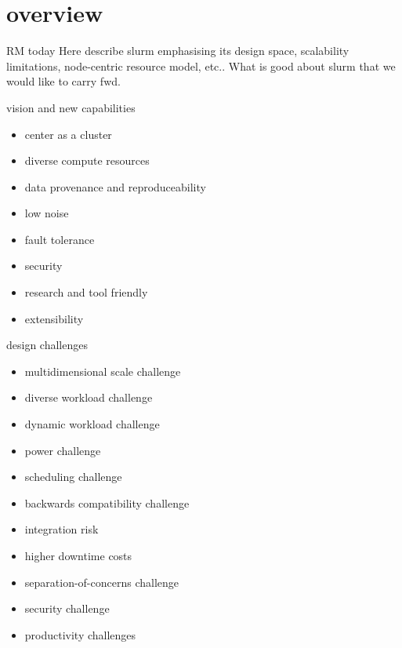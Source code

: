 \documentclass[default,pdf,colorBG,slideColor]{prosper}
\begin{document}
\part{overview}
\begin{slide}{RM today}{\small
Here describe slurm emphasising its design space, scalability
limitations, node-centric resource model, etc..  What is good about slurm
that we would like to carry fwd.
}\end{slide}
\begin{slide}{vision and new capabilities}{\small
\begin{itemize}
  \item{center as a cluster}
  \item{diverse compute resources}
  \item{data provenance and reproduceability}
  \item{low noise}
  \item{fault tolerance}
  \item{security}
  \item{research and tool friendly}
  \item{extensibility}
\end{itemize}
}\end{slide}
\begin{slide}{design challenges}{\small
\begin{minipage}{0.45\textwidth}
\begin{itemize}
  \item{multidimensional scale challenge}
  \item{diverse workload challenge}
  \item{dynamic workload challenge}
  \item{power challenge}
  \item{scheduling challenge}
\end{itemize}
\end{minipage}
\begin{minipage}{0.45\textwidth}
\begin{itemize}
  \item{backwards compatibility challenge}
  \item{integration risk}
  \item{higher downtime costs}
  \item{separation-of-concerns challenge}
  \item{security challenge}
  \item{productivity challenges}
\end{itemize}
\end{minipage}
}\end{slide}
\end{document}
